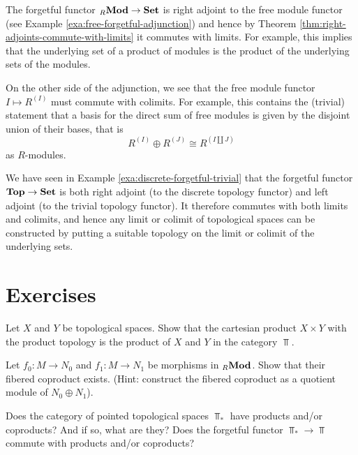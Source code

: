 \begin{example}The forgetful functor ${}_R\mathbf{Mod} \to \mathbf{Set}$ is right adjoint to the free module functor 
(see Example \ref{exa:free-forgetful-adjunction}) and hence by Theorem \ref{thm:right-adjoints-commute-with-limits} it commutes with limits. For example, this implies that the underlying set of a product of modules is the product of the underlying sets of the modules. 

On the other side of the adjunction, we see that the free module functor $I \mapsto R^{(I)}$ must commute with colimits. For example, this contains the (trivial) statement that a basis for the direct sum of free modules is given by the disjoint union of their bases, that is
\[
	R^{(I)} \oplus R^{(J)} \cong R^{(I\amalg J)}
\]
as $R$-modules.
\end{example}

\begin{example}We have seen in Example \ref{exa:discrete-forgetful-trivial} that the forgetful functor $\mathbf{Top}\to \mathbf{Set}$ is both right adjoint (to the discrete topology functor) and left adjoint (to the trivial topology functor). It therefore commutes with both limits and colimits, and hence any limit or colimit of topological spaces can be constructed by putting a suitable topology on the limit or colimit of the underlying sets.
\end{example}




\newpage
\section*{Exercises}


\begin{exercise}
Let $X$ and $Y$ be topological spaces. Show that the cartesian product $X\times Y$ with the product topology is the product of $X$ and $Y$ in the category $\Top$.
\end{exercise}

\begin{exercise}\label{exc:fibered-coproduct-in-Ab}
Let $f_0\colon M\to N_0$ and $f_1\colon M\to N_1$ be morphisms in ${}_R\mathbf{Mod}$. Show that their fibered coproduct exists. (Hint: construct the fibered coproduct as a quotient module of $N_0\oplus N_1$).
\end{exercise}


\begin{exercise}Does the category of pointed topological spaces $\Top_\ast$ have products and/or coproducts? And if so, what are they? Does the forgetful functor $\Top_\ast \to \Top$ commute with products and/or coproducts? 
\end{exercise}

